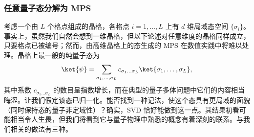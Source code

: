 \subsubsection{任意量子态分解为 MPS}
\label{subsubsec:MPSdecomposition}
考虑一个由 $L$ 个格点组成的晶格，各格点 $i=1,\ldots,L$ 上有 $d$ 维局域态空间 $\{ \sigma_i \}$。事实上，虽然我们自然会想到一维晶格，但以下论述对任意维度的晶格同样成立，只要格点已被编号；然而，由高维晶格上的态生成的 MPS 在数值实践中将难以处理。晶格上最一般的纯量子态为
\begin{equation}
\ket{\psi} = \sum_{\sigma_1,\ldots,\sigma_L} c_{\sigma_1 \ldots \sigma_L} \ket{\sigma_1,\ldots,\sigma_L},
\end{equation}
其中系数 $c_{\sigma_1 \ldots \sigma_L}$ 的数目呈指数增长，而在典型的量子多体问题中它们的内容相当晦涩。让我们假定该态已归一化。能否找到一种记法，使这个态具有更局域的面貌（同时保持态的量子非定域性）？确实，SVD 恰好能做到这一点。其结果初看可能相当令人生畏，但我们将看到它与量子物理中熟悉的概念有着深刻的联系。与我们相关的做法有三种。

